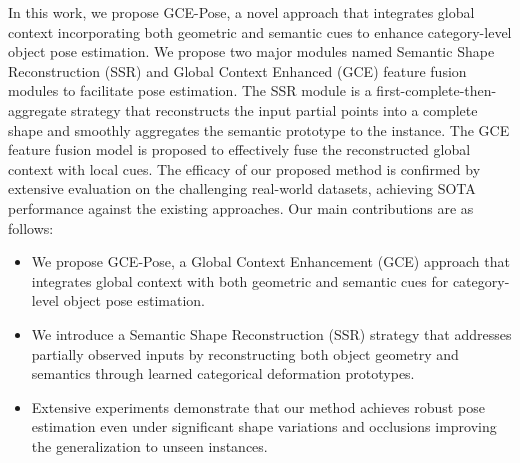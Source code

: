 In this work, we propose GCE-Pose, a novel approach that integrates global context incorporating both geometric and semantic cues to enhance category-level object pose estimation. We propose two major modules named Semantic Shape Reconstruction (SSR) and Global Context Enhanced (GCE) feature fusion modules to facilitate pose estimation. The SSR module is a first-complete-then-aggregate strategy that reconstructs the input partial points into a complete shape and smoothly aggregates the semantic prototype to the instance. The GCE feature fusion model is proposed to effectively fuse the reconstructed global context with local cues. The efficacy of our proposed method is confirmed by extensive evaluation on the challenging real-world datasets, achieving SOTA performance against the existing approaches. Our main contributions are as follows:

\begin{itemize}
    \item We propose GCE-Pose, a Global Context Enhancement (GCE) approach that integrates global context with both geometric and semantic cues for category-level object pose estimation.
    
    \item We introduce a Semantic Shape Reconstruction (SSR) strategy that addresses partially observed inputs by reconstructing both object geometry and semantics through learned categorical deformation prototypes.
    
    \item Extensive experiments demonstrate that our method achieves robust pose estimation even under significant shape variations and occlusions improving the generalization to unseen instances.
\end{itemize}

